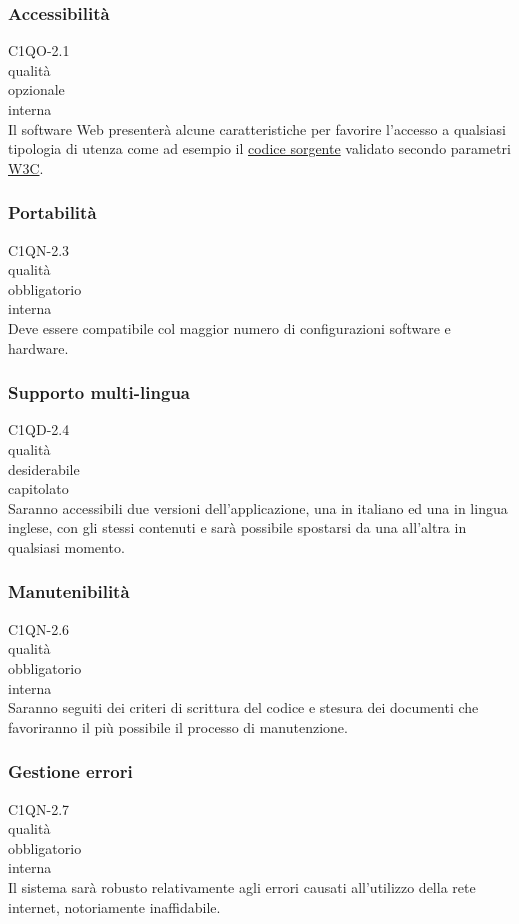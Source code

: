 \subsubsection*{Accessibilit\`a}
 C1QO-2.1 \\
 qualit\`a \\
 opzionale \\
 interna \\
Il software Web presenter\`a alcune caratteristiche per favorire l'accesso a
qualsiasi tipologia di utenza come ad esempio il \underline{codice sorgente}
validato secondo parametri \underline{W3C}.

\subsubsection*{Portabilit\`a}
 C1QN-2.3 \\
 qualit\`a \\
 obbligatorio \\
 interna \\
Deve essere compatibile col maggior numero di configurazioni software e
hardware.

\subsubsection*{Supporto multi-lingua}
 C1QD-2.4 \\
 qualit\`a \\
 desiderabile \\
 capitolato \\
Saranno accessibili due versioni dell'applicazione, una in italiano ed una in
lingua inglese, con gli stessi contenuti e sar\`a possibile spostarsi da una
all'altra in qualsiasi momento.

\subsubsection*{Manutenibilit\`a}
 C1QN-2.6 \\
 qualit\`a \\
 obbligatorio \\
 interna \\
Saranno seguiti dei criteri di scrittura del codice e stesura dei documenti che
favoriranno il pi\`u possibile il processo di manutenzione.

\subsubsection*{Gestione errori}
 C1QN-2.7 \\
 qualit\`a \\
 obbligatorio \\
 interna \\
Il sistema sar\`a robusto relativamente agli errori causati all'utilizzo della
rete internet, notoriamente inaffidabile.

